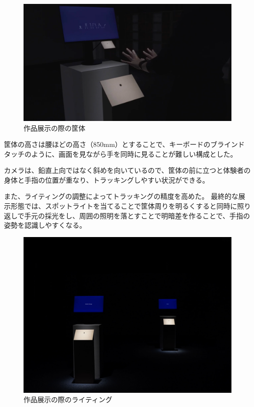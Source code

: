\begin{figure}[H]
  \centering
  \includegraphics[width=15cm]{img/kyotai_ver2.png}
  \caption{作品展示の際の筐体}
  \label{fig:kyotai_ver2}
\end{figure}

筐体の高さは腰ほどの高さ（850mm）とすることで、キーボードのブラインドタッチのように、画面を見ながら手を同時に見ることが難しい構成とした。

カメラは、鉛直上向ではなく斜めを向いているので、筐体の前に立つと体験者の身体と手指の位置が重なり、トラッキングしやすい状況ができる。

また、ライティングの調整によってトラッキングの精度を高めた。
最終的な展示形態では、スポットライトを当てることで筐体周りを明るくすると同時に照り返しで手元の採光をし、周囲の照明を落とすことで明暗差を作ることで、手指の姿勢を認識しやすくなる。

\begin{figure}[H]
  \centering
  \includegraphics[width=15cm]{img/lighting.jpg}
  \caption{作品展示の際のライティング}
  \label{fig:lighting}
\end{figure}
